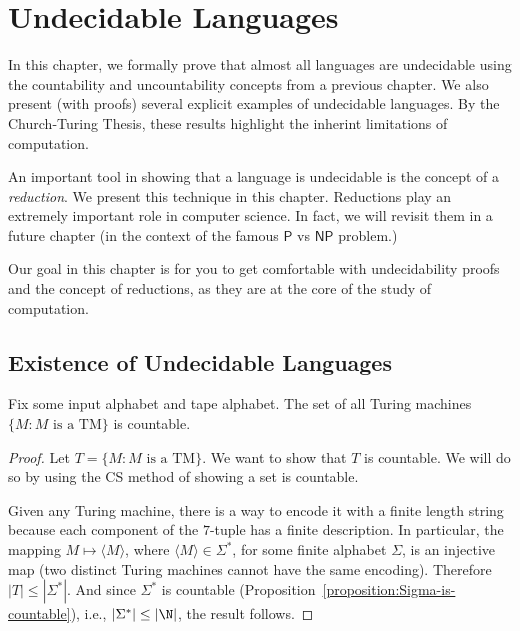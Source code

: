 \chapter{Undecidable Languages}
\label{chapter:Undecidable-Languages}

\begin{preamble}
\label{prmbl:Undecidable-Languages::formally}
In this chapter, we formally prove that almost all languages are undecidable using the countability and uncountability concepts from a previous chapter. We also present (with proofs) several explicit examples of undecidable languages. By the Church-Turing Thesis, these results highlight the inherint limitations of computation.

An important tool in showing that a language is undecidable is the concept of a \emph{reduction}. We present this technique in this chapter. Reductions play an extremely important role in computer science. In fact, we will revisit them in a future chapter (in the context of the famous $\mathsf{P}$ vs $\mathsf{NP}$ problem.)

Our goal in this chapter is for you to get comfortable with undecidability proofs and the concept of reductions, as they are at the core of the study of computation.

\end{preamble}


\section{Existence of Undecidable Languages}
\label{sec:Undecidable-Languages::existence-of-undecidable-languages}

\begin{flex}
\label{grp:proposition:The-set-of-Turing-machines-is-countable}

\begin{proposition}
\label{proposition:The-set-of-Turing-machines-is-countable}
Fix some input alphabet and tape alphabet. The set of all Turing machines $\{M : M \text{ is a TM}\}$ is countable.

\end{proposition}

\begin{proof}
\label{prf:Undecidable-Languages::countable}
Let $T = \{M : M \text{ is a TM}\}$. We want to show that $T$ is countable. We will do so by using the CS method of showing a set is countable. 

Given any Turing machine, there is a way to encode it with a finite length string because each component of the $7$-tuple has a finite description. In particular, the mapping $M \mapsto \langle M \rangle$, where $\langle M \rangle \in \Sigma^*$, for some finite alphabet $\Sigma$, is an injective map (two distinct Turing machines cannot have the same encoding). Therefore $|T| \leq |\Sigma^*|$. And since $\Sigma^*$ is countable (Proposition~\ref{proposition:Sigma-is-countable}), i.e., $|\Sigma^*| \leq |\N|$, the result follows.

\end{proof}
\end{flex}


